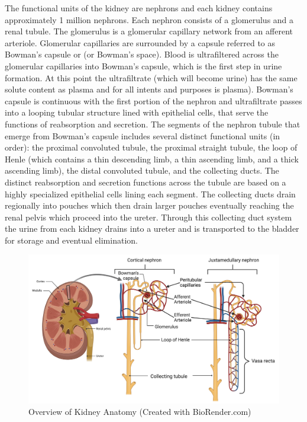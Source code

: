 The functional units of the kidney are nephrons and each kidney contains approximately 1 million nephrons. Each nephron consists of a glomerulus and a renal tubule. The glomerulus is a glomerular capillary network from an afferent arteriole. Glomerular capillaries are surrounded by a capsule referred to as Bowman’s capsule or (or Bowman’s space).  Blood is ultrafiltered across the glomerular capillaries into Bowman’s capsule, which is the first step in urine formation. At this point the ultrafiltrate (which will become urine) has the same solute content as plasma and for all intents and purposes is plasma). Bowman’s capsule is continuous with the first portion of the nephron and ultrafiltrate passes into a looping tubular structure lined with epithelial cells, that serve the functions of reabsorption and secretion. 
The segments of the nephron tubule that emerge from Bowman’s capsule includes several distinct functional units (in order): the proximal convoluted tubule, the proximal straight tubule, the loop of Henle (which contains a thin descending limb, a thin ascending limb, and a thick ascending limb), the distal convoluted tubule, and the collecting ducts. The distinct reabsorption and secretion functions across the tubule are based on a highly specialized epithelial cells lining each segment. The collecting ducts drain regionally into pouches which then drain larger pouches eventually reaching the renal pelvis which proceed into the ureter. Through this collecting duct system the urine from each kidney drains into a ureter and is transported to the bladder for storage and eventual elimination.

\begin{figure}[!h]
    \centering
    \includegraphics[width=1.0\linewidth]{./figure/Kidney_Anatomy.png}
    \caption{Overview of Kidney Anatomy \footnotesize{(Created with BioRender.com)}}
    \label{fig:Kidney_Anatomy}
\end{figure}

